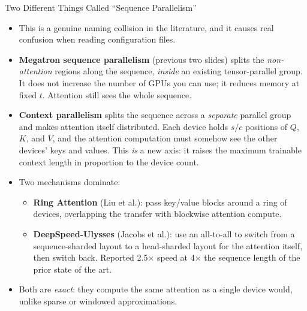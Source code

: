 \begin{frame}[allowframebreaks]{Two Different Things Called ``Sequence Parallelism''}
  \begin{itemize}\itemsep0.45em
    \item[\textcolor{red}{$\blacktriangleright$}] This is a genuine naming collision in the literature, and it causes real confusion when reading configuration files.
    \item[\textcolor{red}{$\blacktriangleright$}] \textbf{Megatron sequence parallelism} (previous two slides) splits the \emph{non-attention} regions along the sequence, \emph{inside} an existing tensor-parallel group. It does not increase the number of GPUs you can use; it reduces memory at fixed $t$. Attention still sees the whole sequence.
    \item[\textcolor{red}{$\blacktriangleright$}] \textbf{Context parallelism} splits the sequence across a \emph{separate} parallel group and makes attention itself distributed. Each device holds $s/c$ positions of $Q$, $K$, and $V$, and the attention computation must somehow see the other devices' keys and values. This \emph{is} a new axis: it raises the maximum trainable context length in proportion to the device count.
    \item[\textcolor{red}{$\blacktriangleright$}] Two mechanisms dominate:
      \begin{itemize}\itemsep0.2em\footnotesize
        \item \textbf{Ring Attention} (Liu et al.): pass key/value blocks around a ring of devices, overlapping the transfer with blockwise attention compute.
        \item \textbf{DeepSpeed-Ulysses} (Jacobs et al.): use an all-to-all to switch from a sequence-sharded layout to a head-sharded layout for the attention itself, then switch back. Reported 2.5$\times$ speed at 4$\times$ the sequence length of the prior state of the art.
      \end{itemize}
    \item[\textcolor{red}{$\blacktriangleright$}] Both are \emph{exact}: they compute the same attention as a single device would, unlike sparse or windowed approximations.
  \end{itemize}
\end{frame}

